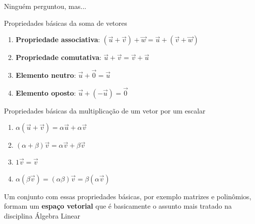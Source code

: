 \begin{frame}{Ninguém perguntou, mas...}
    \begin{tcolorbox}[colback=red!10]
        Propriedades básicas da soma de vetores
        \begin{enumerate}
            \item \textbf{Propriedade associativa}:
                \((\vec{u}+\vec{v})+\vec{w}=\vec{u}+(\vec{v}+\vec{w})\)
            \item \textbf{Propriedade comutativa}: \(\vec{u}+\vec{v}=\vec{v}+\vec{u}\)
            \item \textbf{Elemento neutro}: \(\vec{u}+\vec{0}=\vec{u}\)
            \item \textbf{Elemento oposto}: \(\vec{u}+(-\vec{u})=\vec{0}\)
        \end{enumerate}
    \end{tcolorbox}
    \begin{tcolorbox}[colback=blue!10]
        Propriedades básicas da multiplicação de um vetor por um escalar
        \begin{enumerate}
            \item \(\alpha(\vec{u}+\vec{v})=\alpha\vec{u}+\alpha\vec{v}\)
            \item \((\alpha+\beta)\vec{v}=\alpha\vec{v}+\beta\vec{v}\)
            \item \(1\vec{v}=\vec{v}\)
            \item \(\alpha(\beta\vec{v})=(\alpha\beta)\vec{v}=\beta(\alpha\vec{v})\)
        \end{enumerate}
    \end{tcolorbox}
        Um conjunto com essas propriedades básicas, por exemplo matrizes e polinômios, formam um \textbf{espaço vetorial} que é
        basicamente o assunto mais tratado na disciplina Álgebra Linear
\end{frame}

